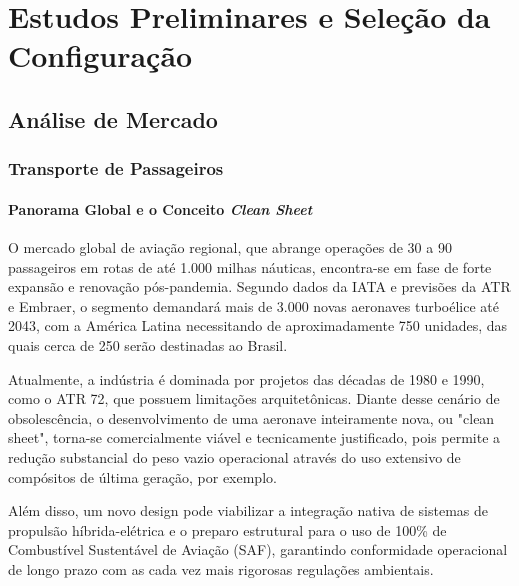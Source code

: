 \chapter{Estudos Preliminares e Seleção da Configuração}

\section{Análise de Mercado}

\subsection{Transporte de Passageiros}

\subsubsection{Panorama Global e o Conceito \textit{Clean Sheet}}

O mercado global de aviação regional, que abrange operações de 30 a 90 passageiros em rotas de até 1.000 milhas náuticas, encontra-se em fase de forte expansão e renovação pós-pandemia. Segundo dados da IATA e previsões da ATR e Embraer, o segmento demandará mais de 3.000 novas aeronaves turboélice até 2043, com a América Latina necessitando de aproximadamente 750 unidades, das quais cerca de 250 serão destinadas ao Brasil. 



Atualmente, a indústria é dominada por projetos das décadas de 1980 e 1990, como o ATR 72, que possuem limitações arquitetônicas. Diante desse cenário de obsolescência, o desenvolvimento de uma aeronave inteiramente nova, ou "clean sheet", torna-se comercialmente viável e tecnicamente justificado, pois permite a redução substancial do peso vazio operacional através do uso extensivo de compósitos de última geração, por exemplo.

Além disso, um novo design pode viabilizar a integração nativa de sistemas de propulsão híbrida-elétrica e o preparo estrutural para o uso de 100\% de Combustível Sustentável de Aviação (SAF), garantindo conformidade operacional de longo prazo com as cada vez mais rigorosas regulações ambientais.

